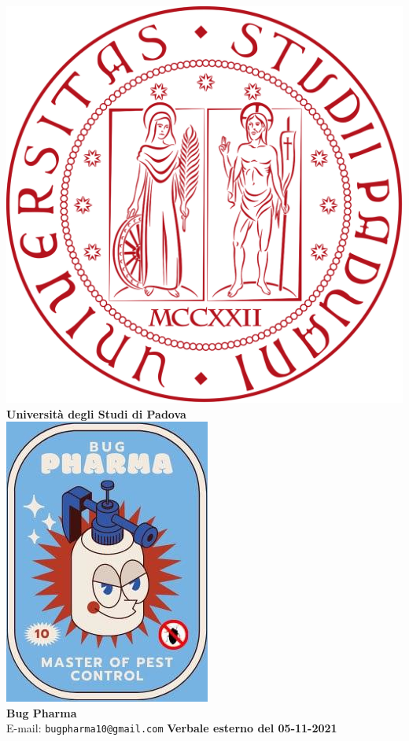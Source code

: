 \documentclass[11pt]{article}
\begin{document}
	\thispagestyle{empty}
	\begin{titlepage}
		\begin{center}
			\includegraphics[scale = 0.05]{../../logo_unipd.png}\\
			\large \textbf{Università degli Studi di Padova} \\
			\vfill
			\includegraphics[scale = 0.7]{../../logo_small.jpg}\\
			\large \textbf{Bug Pharma} \\
			\vfill
			\large
			E-mail: 
			\texttt{bugpharma10@gmail.com}
			\vfill
			\Huge \textbf{Verbale esterno del 05-11-2021}\\
			

\end{center}
\end{titlepage}
\end{document}
